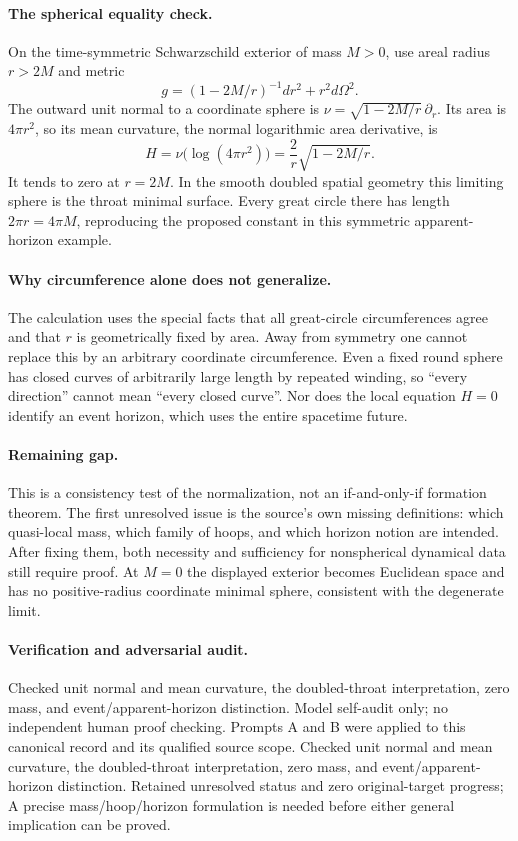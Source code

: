 \documentclass[11pt]{article}
\begin{document}
\paragraph{The spherical equality check.} On the time-symmetric Schwarzschild exterior of mass $M>0$, use areal radius $r>2M$ and metric
\[
 g=(1-2M/r)^{-1}dr^2+r^2d\Omega^2.
\]
The outward unit normal to a coordinate sphere is $\nu=\sqrt{1-2M/r}\,\partial_r$. Its area is $4\pi r^2$, so its mean curvature, the normal logarithmic area derivative, is
\[
 H=\nu\bigl(\log(4\pi r^2)\bigr)=\frac2r\sqrt{1-2M/r}.
\]
It tends to zero at $r=2M$. In the smooth doubled spatial geometry this limiting sphere is the throat minimal surface. Every great circle there has length $2\pi r=4\pi M$, reproducing the proposed constant in this symmetric apparent-horizon example.

\paragraph{Why circumference alone does not generalize.} The calculation uses the special facts that all great-circle circumferences agree and that $r$ is geometrically fixed by area. Away from symmetry one cannot replace this by an arbitrary coordinate circumference. Even a fixed round sphere has closed curves of arbitrarily large length by repeated winding, so ``every direction'' cannot mean ``every closed curve''. Nor does the local equation $H=0$ identify an event horizon, which uses the entire spacetime future.

\paragraph{Remaining gap.} This is a consistency test of the normalization, not an if-and-only-if formation theorem. The first unresolved issue is the source's own missing definitions: which quasi-local mass, which family of hoops, and which horizon notion are intended. After fixing them, both necessity and sufficiency for nonspherical dynamical data still require proof. At $M=0$ the displayed exterior becomes Euclidean space and has no positive-radius coordinate minimal sphere, consistent with the degenerate limit.

\paragraph{Verification and adversarial audit.}
Checked unit normal and mean curvature, the doubled-throat interpretation, zero mass, and event/apparent-horizon distinction. Model self-audit only; no independent human proof checking. Prompts A and B were applied to this canonical record and its qualified source scope. Checked unit normal and mean curvature, the doubled-throat interpretation, zero mass, and event/apparent-horizon distinction. Retained unresolved status and zero original-target progress; A precise mass/hoop/horizon formulation is needed before either general implication can be proved.
\end{document}
